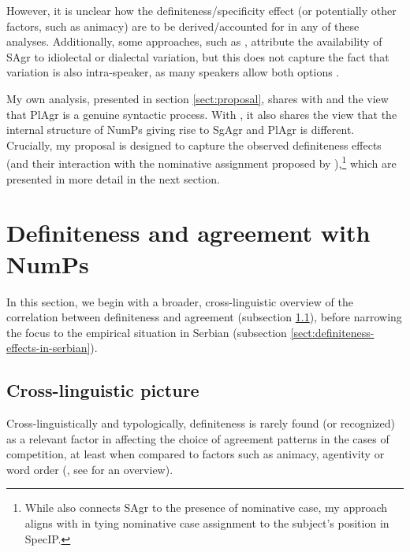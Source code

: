 \documentclass[output=paper,colorlinks,citecolor=brown
]{langscibook}
\begin{document}
\noindent However, it is unclear how the definiteness/specificity effect (or potentially other factors, such as animacy) are to be derived/accounted for in any of these analyses. Additionally, some approaches, such as \citet{Zlatic1997}, attribute the availability of SAgr to idiolectal or dialectal variation, but this does not capture the fact that variation is also intra-speaker, as many speakers allow both options \citep{Milosavljevic2018nasledje}.

My own analysis, presented in section \ref{sect:proposal}, shares with \citet{Driemel2019} and \citet{Culinovic2017} the view that PlAgr is a genuine syntactic process. With \citet{Culinovic2017}, it also shares the view that the internal structure of NumPs giving rise to SgAgr and PlAgr is different. 
Crucially, my proposal is designed to capture the observed definiteness effects (and their interaction with the nominative assignment proposed by \citealt{Boskovic2008}),\footnote{While \citet{Zlatic1997} also connects SAgr to the presence of nominative case, my approach aligns with \citet{Boskovic2008} in tying nominative case assignment to the subject’s position in SpecIP.} which are presented in more detail in the next section.

\section{Definiteness and agreement with NumPs} \label{sect:definiteness}

In this section, we begin with a broader, cross-linguistic overview of the correlation between definiteness and agreement (subsection \ref{subsect:definiteness-cross-ling}), before narrowing the focus to the empirical situation in Serbian (subsection \ref{sect:definiteness-effects-in-serbian}).

\subsection{Cross-linguistic picture}\label{subsect:definiteness-cross-ling}
Cross-linguistically and typologically, definiteness is rarely found (or recognized) as a relevant factor in affecting the choice of agreement patterns in the cases of competition, at least when compared to factors such as animacy, agentivity or word order (\citealt{Corbett2006}, see \citealt{Milosavljevic2017, Milosavljevic2018MS} for an overview). 
\end{document}
